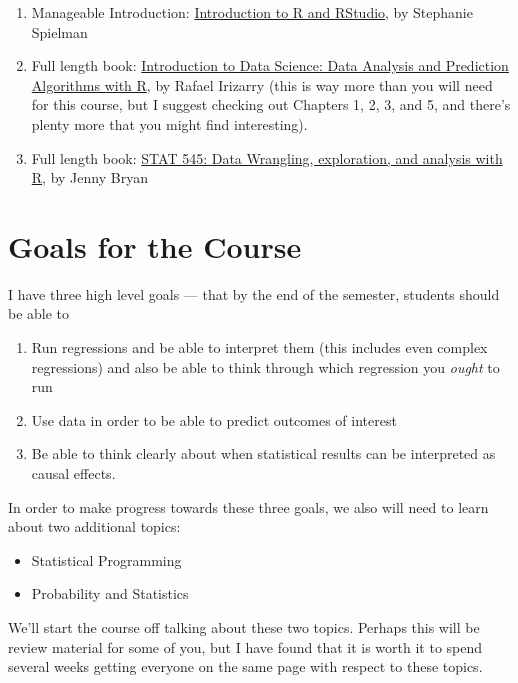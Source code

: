 \documentclass[
  letterpaper,
  DIV=11,
  numbers=noendperiod]{scrreprt}
\begin{document}
\begin{enumerate}
\def\labelenumi{\arabic{enumi}.}
\item
  Manageable Introduction:
  \href{https://sjspielman.github.io/datascience_for_biologists/tutorials/introduction_to_R.html}{Introduction
  to R and RStudio}, by Stephanie Spielman
\item
  Full length book:
  \href{(https://rafalab.github.io/dsbook/)}{Introduction to Data
  Science: Data Analysis and Prediction Algorithms with R}, by Rafael
  Irizarry (this is way more than you will need for this course, but I
  suggest checking out Chapters 1, 2, 3, and 5, and there's plenty more
  that you might find interesting).
\item
  Full length book: \href{https://stat545.com/}{STAT 545: Data
  Wrangling, exploration, and analysis with R}, by Jenny Bryan
\end{enumerate}

\section{Goals for the Course}\label{goals-for-the-course}

I have three high level goals --- that by the end of the semester,
students should be able to

\begin{enumerate}
\def\labelenumi{\arabic{enumi}.}
\item
  Run regressions and be able to interpret them (this includes even
  complex regressions) and also be able to think through which
  regression you \emph{ought} to run
\item
  Use data in order to be able to predict outcomes of interest
\item
  Be able to think clearly about when statistical results can be
  interpreted as causal effects.
\end{enumerate}

In order to make progress towards these three goals, we also will need
to learn about two additional topics:

\begin{itemize}
\item
  Statistical Programming
\item
  Probability and Statistics
\end{itemize}

We'll start the course off talking about these two topics. Perhaps this
will be review material for some of you, but I have found that it is
worth it to spend several weeks getting everyone on the same page with
respect to these topics.
\end{document}
